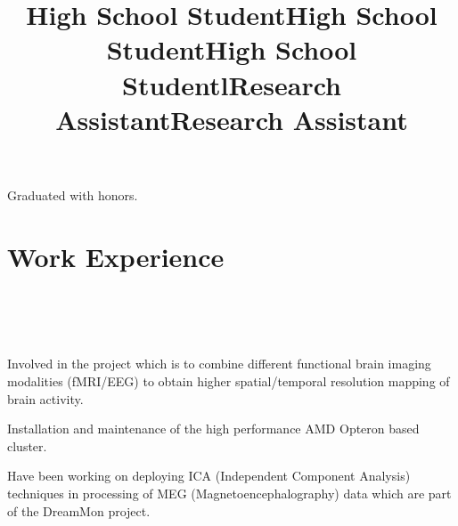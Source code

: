 \documentclass[10pt,overlapped,line]{res}
\begin{document}
\begin{resume}
 \title{High School Student}
 \begin{position}
  Graduated with honors.
 \end{position}

 \title{High School Student}
 \begin{position}
 \end{position}

 \title{High School Student}
 \begin{position}
 \end{position}

 \section{Work Experience}
 \begin{format}
   \title{l}\\
   \\
   \body\\
 \end{format}

 \title{Research Assistant}
 \begin{position}
   Involved in the project which is to combine different functional
   brain imaging modalities (f{MRI}/{EEG}) to obtain higher
   spatial/temporal resolution mapping of brain activity.

   Installation and maintenance of the high performance {AMD}
   {O}pteron based cluster.
 \end{position}

 \title{Research Assistant}
 \begin{position}
   Have been working  on deploying ICA (Independent Component
   Analysis) techniques in processing of MEG (Magnetoencephalography)
   data which are part of the DreamMon project.


\end{position}
\end{resume}
\end{document}
